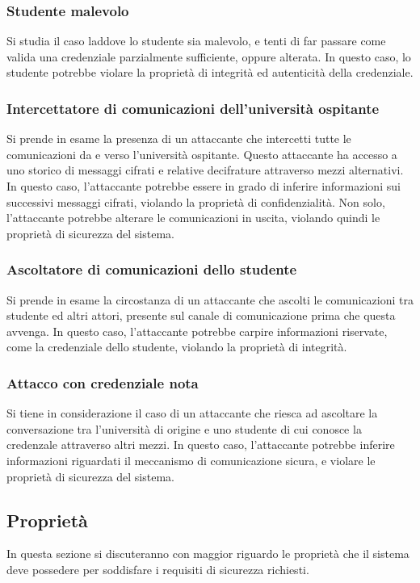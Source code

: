 \documentclass[a4paper,12pt]{article}
\begin{document}
\subsubsection{Studente malevolo}
Si studia il caso laddove lo studente sia malevolo, e tenti di far passare come valida una credenziale parzialmente sufficiente, oppure alterata. In questo caso, lo studente potrebbe violare la proprietà di integrità ed autenticità della credenziale.
\subsubsection{Intercettatore di comunicazioni dell'università ospitante}
Si prende in esame la presenza di un attaccante che intercetti tutte le comunicazioni da e verso l'università ospitante. Questo attaccante ha accesso a uno storico di messaggi cifrati e relative decifrature attraverso mezzi alternativi. 
\newline In questo caso, l'attaccante potrebbe essere in grado di inferire informazioni sui successivi messaggi cifrati, violando la proprietà di confidenzialità. Non solo, l'attaccante potrebbe alterare le comunicazioni in uscita, violando quindi le proprietà di sicurezza del sistema.
\subsubsection{Ascoltatore di comunicazioni dello studente}
Si prende in esame la circostanza di un attaccante che ascolti le comunicazioni tra studente ed altri attori, presente sul canale di comunicazione prima che questa avvenga. In questo caso, l'attaccante potrebbe carpire informazioni riservate, come la credenziale dello studente, violando la proprietà di integrità.
\subsubsection{Attacco con credenziale nota}
Si tiene in considerazione il caso di un attaccante che riesca ad ascoltare la conversazione tra l'università di origine e uno studente di cui conosce la credenzale attraverso altri mezzi.
\newline In questo caso, l'attaccante potrebbe inferire informazioni riguardati il meccanismo di comunicazione sicura, e violare le proprietà di sicurezza del sistema. 

\subsection{Proprietà}
In questa sezione si discuteranno con maggior riguardo le proprietà che il sistema deve possedere per soddisfare i requisiti di sicurezza richiesti.
\end{document}
